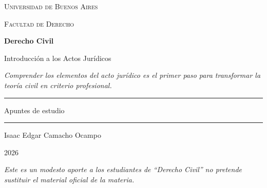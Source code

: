 \documentclass[12pt,oneside]{book}
\newcommand{\universidad}{Universidad de Buenos Aires}
\newcommand{\facultad}{Facultad de Derecho}
\newcommand{\materia}{Derecho Civil}
\newcommand{\titulo}{Introducción a los Actos Jurídicos}
\newcommand{\autor}{Isaac Edgar Camacho Ocampo}
\newcommand{\anio}{2026}
\begin{document}
\begin{titlepage}

\thispagestyle{empty}

\begin{center}

\vspace*{1cm}

{\large \textsc{\universidad}}

\vspace{0.2cm}

{\large \textsc{\facultad}}

\vspace{3cm}

{\Huge \textbf{\materia}}

\vspace{1cm}

{\LARGE \titulo}

\vspace{0.8cm}

\textit{Comprender los elementos del acto jurídico es el primer paso para transformar la teoría civil en criterio profesional.}

\vspace{1.2cm}

\rule{0.70\textwidth}{0.5pt}

\vspace{0.5cm}

{\large Apuntes de estudio}

\vspace{0.5cm}

\rule{0.70\textwidth}{0.5pt}

\vfill

{\large \autor}

\vspace{0.3cm}

{\large \anio}

\end{center}

\vfill

\begin{flushleft}
\textit{Este es un modesto aporte a los estudiantes de ``\materia'' no pretende sustituir el material oficial de la materia.}
\end{flushleft}

\end{titlepage}

\tableofcontents
\end{document}
